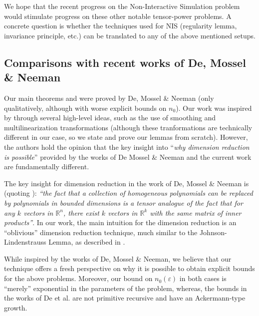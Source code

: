 \documentclass[11pt]{article}
\newcommand{\eps}{\varepsilon}
\newcommand{\bbR}{{\mathbb R}}
\begin{document}
We hope that the recent progress on the Non-Interactive Simulation problem would stimulate progress on these other notable tensor-power problems. A concrete question is whether the techniques used for NIS (regularity lemma, invariance principle, etc.) can be translated to any of the above mentioned setups.

\subsection{Comparisons with recent works of De, Mossel \& Neeman}

Our main theorems  and  were proved by De, Mossel \& Neeman \cite{DMN_NoiseStabilityComputable, DMN_NIS_decidable} (only qualitatively, although with worse explicit bounds on $n_0$). Our work was inspired by \cite{DMN_NoiseStabilityComputable,DMN_NIS_decidable} through several high-level ideas, such as the use of smoothing and multilinearization transformations (although these tranformations are technically different in our case, so we state and prove our lemmas from scratch). However, the authors hold the opinion that the key insight into ``{\em why dimension reduction is possible}'' provided by the works of De Mossel \& Neeman and the current work are fundamentally different. 
%

The key insight for dimension reduction in the work of De, Mossel \& Neeman is (quoting \cite{DMN_NoiseStabilityComputable}): {\em ``the fact that a collection of homogeneous polynomials can be replaced by polynomials in bounded dimensions is a tensor analogue of the fact that for any $k$ vectors in $\bbR^n$, there exist $k$ vectors in $\bbR^k$ with the same matrix of inner products''}. In our work, the main intuition for the dimension reduction is an ``oblivious'' dimension reduction technique, much similar to the Johnson-Lindenstrauss Lemma, as described in .

	While inspired by the works of De, Mossel \& Neeman, we believe that our technique offers a fresh perspective on why it is possible to obtain explicit bounds for the above problems. Moreover, our bound on $n_0(\eps)$ in both cases is ``merely'' exponential in the parameters of the problem, whereas, the bounds in the works of De et al. are not primitive recursive and have an Ackermann-type growth.
\end{document}
